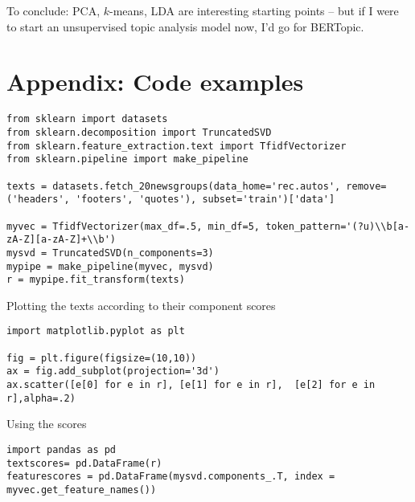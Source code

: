 \begin{frame}[standout]
To conclude: PCA, $k$-means, LDA are interesting starting points -- but if I were to start an unsupervised topic analysis model now, I'd go for BERTopic.

\end{frame}






\section[Appendix]{Appendix: Code examples}


\begin{frame}{}
  \begin{verbatim}
from sklearn import datasets
from sklearn.decomposition import TruncatedSVD
from sklearn.feature_extraction.text import TfidfVectorizer
from sklearn.pipeline import make_pipeline

texts = datasets.fetch_20newsgroups(data_home='rec.autos', remove=('headers', 'footers', 'quotes'), subset='train')['data']

myvec = TfidfVectorizer(max_df=.5, min_df=5, token_pattern='(?u)\\b[a-zA-Z][a-zA-Z]+\\b')
mysvd = TruncatedSVD(n_components=3)
mypipe = make_pipeline(myvec, mysvd)
r = mypipe.fit_transform(texts)
\end{verbatim}
\end{frame}





\begin{frame}[fragile]{Plotting the texts according to their component scores}
\begin{lstlisting}
import matplotlib.pyplot as plt

fig = plt.figure(figsize=(10,10))
ax = fig.add_subplot(projection='3d')
ax.scatter([e[0] for e in r], [e[1] for e in r],  [e[2] for e in r],alpha=.2)
\end{lstlisting}


\end{frame}



\begin{frame}[fragile]{Using the scores}
\begin{lstlisting}
import pandas as pd
textscores= pd.DataFrame(r)
featurescores = pd.DataFrame(mysvd.components_.T, index = myvec.get_feature_names())
\end{lstlisting}


\end{frame}



